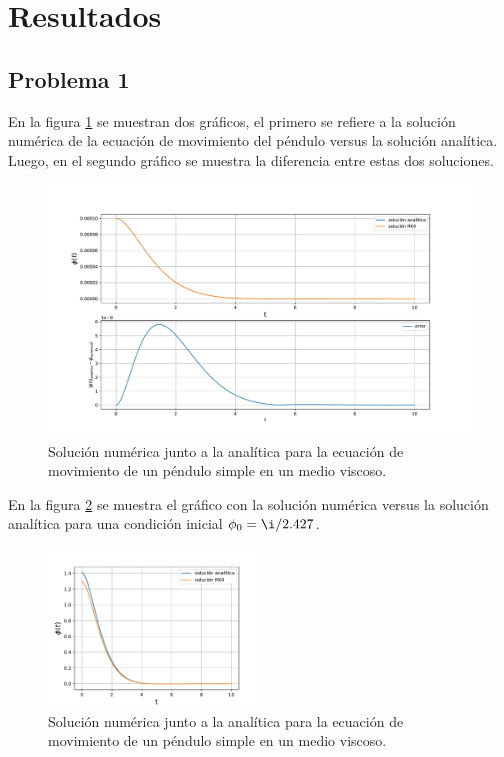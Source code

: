 \documentclass[letterpaper,oneside]{article}
\begin{document}
\section{Resultados}
\subsection{Problema 1}
En la figura \ref{grafico phi sin perturbacion} se muestran dos gráficos, el primero se refiere a la solución numérica de la ecuación de movimiento del péndulo versus la solución analítica. Luego, en el segundo gráfico se muestra la diferencia entre estas dos soluciones.
\begin{figure}
    \centering    
    \includegraphics[width=1\textwidth]{Tarea 2/grafico phi sin perturbacion pregunta 1.pdf}
    \caption{Solución numérica junto a la analítica para la ecuación de movimiento de un péndulo simple en un medio viscoso.}
    \label{grafico phi sin perturbacion}
\end{figure}{}
En la figura \ref{grafico phi con perturbacion} se muestra el gráfico con la solución numérica versus la solución analítica para una condición inicial $\phi_0=\i/2.427$.
\begin{figure}
    \centering    
    \includegraphics[width=0.5\textwidth]{Tarea 2/grafico phi con perturbacion pregunta 1.pdf}
    \caption{Solución numérica junto a la analítica para la ecuación de movimiento de un péndulo simple en un medio viscoso.}
    \label{grafico phi con perturbacion}
\end{figure}{}
\end{document}
